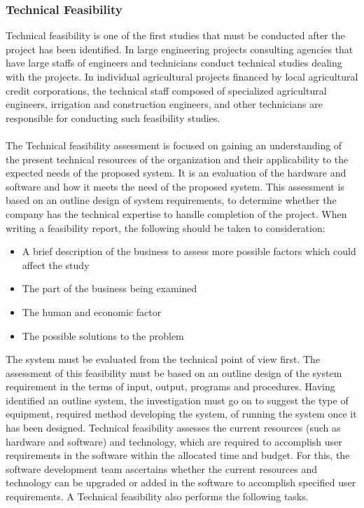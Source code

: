 \subsubsection{Technical Feasibility}
Technical feasibility is one of the first studies that must be conducted after the project has been identified. In large engineering projects consulting agencies that have large staffs of engineers and technicians conduct technical studies dealing with the projects. In individual agricultural projects financed by local agricultural credit corporations, the technical staff composed of specialized agricultural engineers, irrigation and construction engineers, and other technicians are responsible for conducting such feasibility studies.\\\\ The Technical feasibility assessment is focused on gaining an understanding of the present technical resources of the organization and their applicability to the expected needs of the proposed system. It is an evaluation of the hardware and software and how it meets the need of the proposed system. This assessment is based on an outline design of system requirements, to determine whether the company has the technical expertise to handle completion of the project. When writing a feasibility report, the following should be taken to consideration:
\begin{itemize}
	\item A brief description of the business to assess more possible factors which could affect the study
	\item The part of the business being examined
	\item The human and economic factor
	\item The possible solutions to the problem
\end{itemize}

The system must be evaluated from the technical point of view first. The assessment of this feasibility must be based on an outline design of the system requirement in the terms of input, output, programs and procedures. Having identified an outline system, the investigation must go on to suggest the type of equipment, required method developing the system, of running the system once it has been designed. Technical feasibility assesses the current resources (such as hardware and software) and technology, which are required to accomplish user requirements in the software within the allocated time and budget. For this, the software development team ascertains whether the current resources and technology can be upgraded or added in the software to accomplish specified user requirements. A Technical feasibility also performs the following tasks.

